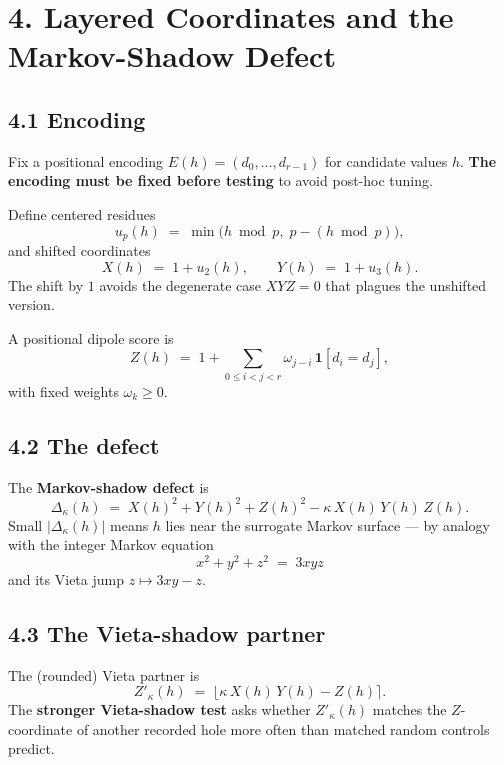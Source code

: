 \documentclass[
  11pt,
]{article}
\begin{document}
\hypertarget{layered-coordinates-and-the-markov-shadow-defect}{%
\section{4. Layered Coordinates and the Markov-Shadow
Defect}\label{layered-coordinates-and-the-markov-shadow-defect}}

\hypertarget{encoding}{%
\subsection{4.1 Encoding}\label{encoding}}

Fix a positional encoding \(E(h) = (d_0, \dots, d_{r-1})\) for candidate
values \(h\). \textbf{The encoding must be fixed before testing} to
avoid post-hoc tuning.

Define centered residues \[
u_p(h) \;=\; \min\!\bigl(h \bmod p,\; p - (h \bmod p)\bigr),
\] and shifted coordinates \[
X(h) \;=\; 1 + u_2(h), \qquad Y(h) \;=\; 1 + u_3(h).
\] The shift by \(1\) avoids the degenerate case \(XYZ = 0\) that
plagues the unshifted version.

A positional dipole score is \[
Z(h) \;=\; 1 + \sum_{0 \le i < j < r} \omega_{j-i}\,\mathbf{1}[d_i = d_j],
\] with fixed weights \(\omega_k \ge 0\).

\hypertarget{the-defect}{%
\subsection{4.2 The defect}\label{the-defect}}

The \textbf{Markov-shadow defect} is \[
\boxed{\;\Delta_\kappa(h) \;=\; X(h)^2 + Y(h)^2 + Z(h)^2 - \kappa\, X(h)\, Y(h)\, Z(h).\;}
\] Small \(|\Delta_\kappa(h)|\) means \(h\) lies near the surrogate
Markov surface --- by analogy with the integer Markov equation \[
x^2 + y^2 + z^2 \;=\; 3xyz
\] and its Vieta jump \(z \mapsto 3xy - z\).

\hypertarget{the-vieta-shadow-partner}{%
\subsection{4.3 The Vieta-shadow
partner}\label{the-vieta-shadow-partner}}

The (rounded) Vieta partner is \[
Z'_\kappa(h) \;=\; \bigl\lfloor \kappa\, X(h)\, Y(h) - Z(h) \bigr\rceil.
\] The \textbf{stronger Vieta-shadow test} asks whether \(Z'_\kappa(h)\)
matches the \(Z\)-coordinate of another recorded hole more often than
matched random controls predict.
\end{document}
